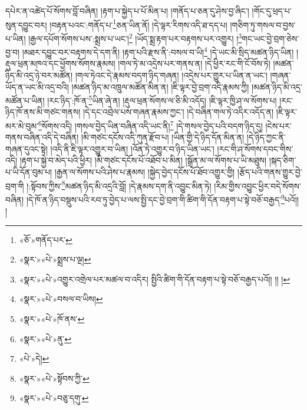 དཔེར་ན་འཚེད་པོ་སོགས་བློ་བཞིན། །རྟག་པ་སྐྱེད་པ་པོ་མིན་པ། །གནོད་པ་ཅན་དུ་ཤེས་བྱ་ཞིང་། །གོང་དུ་ཕྲད་པ་སུན་དབྱུང་བར། །བརྟན་པའང་:གནོད་པ་\footnote{«ཅོ་»གནོད་པར་}ཅན་ཡིན་ནོ། །དེ་ལྟར་རིགས་འདི་ཐ་དད་པ། །གཅིག་ཏུ་གསལ་བ་བྱས་པ་ཡིན། །རྒྱལ་དཔོག་སོགས་པས་:སྨྲས་པ་ཡང་།\footnote{«སྣར་»«པེ་»སྨྲས་པ་ལྔ།} །ཡོད་སྨྲ་རྟག་པར་བརྟགས་པར་འགྱུར། །\footnote{«སྣར་»«པེ་»འགྱུར་འགྲེལ་པར་མཚལ་བ་འདིར། སྤྱིའི་ཚིག་གི་དོན་བརྟག་པ་སྟེ་བཅོ་བརྒྱད་པའོ།། །། །}གང་ཡང་བྱེ་བྲག་ཅེས་བྱ་བ། །མཐར་དབྱུང་བར་བརྟགས་དེ་དག་ནི། །རྟག་པའི་རྫས་ནི་:བསལ་བ་ཡི།\footnote{«སྣར་»«པེ་»བསལ་བ་ཡིས།} །དེ་ཡང་མི་སྲིད་མཚན་ཉིད་ཡིན། །རྡུལ་ཕྲན་མཁའ་དང་ཕྱོགས་སོགས་རྣམས། །གལ་ཏེ་མ་འདྲེས་པར་གནས་ན། །དེ་ཕྱིར་རང་གི་ངོ་བོས་ཏེ། །མཚན་ཉིད་མི་འདྲ་ཉེ་བར་མཚོན། །གལ་ཏེའང་དེ་རྣམས་བདག་ཉིད་གཞན། །འདྲེས་པར་གྱུར་པ་ཡིན་ན་ཡང་། །གཞན་ཡོད་ན་ཡང་མི་འདྲ་བའི། །མཚན་ཉིད་མ་འཁྲུལ་མཚོན་མིན་ན། །ཇི་ལྟར་བྱེ་བྲག་འདི་རྣམས་ཀྱི། །མཚན་ཉིད་མི་འདྲ་མཚོན་པ་ཡིན། །རང་ཉིད་:ཁོ་ན་\footnote{«སྣར་»«པེ་»ཁོ་ནས་}ཡིན་ཞེ་ན། །རྡུལ་ཕྲན་སོགས་ལ་ཅི་མི་འདོད། །ཇི་ལྟར་ཁྱི་ཤ་ལ་སོགས་པ། །རང་ཉིད་ཁོ་ནས་མི་གཙང་གནས། །དེ་དང་འབྲེལ་པས་གཞན་རྣམས་ཀྱང་། །དེ་བཞིན་གལ་ཏེ་འདིར་འདོད་ན། །ཇི་ལྟར་མར་མེ་བུམ་\footnote{«སྣར་»«པེ་»ནུ་}སོགས་འདི། །གསལ་བྱེད་ཡིན་བཞིན་འདི་ཡང་ནི།\footnote{«པེ་»དེ།} །དེ་གསལ་བྱེད་པའི་བདག་ཉིད་དུ། །ངེས་པར་གནས་བཞིན་འདི་དེ་བཞིན། །མི་གཙང་དངོས་འདི་ཀུན་རྫོབ་པ། །ཡིན་གྱི་དེ་ཉིད་དོན་མིན་ན། །དེ་ཉིད་ཀྱང་ནི་གཞན་དུའང་སྟེ། །འདི་ནི་ཇི་ལྟར་འགྱུར་བ་ཡིན། །འོན་ཏེ་འགྱུར་བ་ཉིད་ཡིན་ཡང་། །རང་གི་ཤ་སོགས་དབང་གིས་འདི། །རྟག་པ་སྐྱེ་བ་མེད་པའི་ཕྱིར། །མི་གཙང་དངོས་པོ་འཐོབ་པ་མིན། །སྒྲོན་མ་ལ་སོགས་པ་ཡི་མཐུས། །སྐད་ཅིག་པ་ཡི་དོན་བུམ་པ། །རྒྱན་ལ་སོགས་པའི་ཤེས་པ་རྣམས། །སྐྱེད་བྱེད་དངོས་པོ་ཐོབ་འགྱུར་གྱི། །རྩོད་པའི་གནས་གྱུར་བྱེ་བྲག་གི །:སྟོབས་ཀྱིས་\footnote{«སྣར་»«པེ་»སྟོབས་ཀྱི་}མཚན་ཉིད་མི་འདྲའི་བློ། །དེ་རྣམས་དག་ནི་འབྱུང་མིན་ཏེ། །རིམ་གྱིས་འབྱུང་ཕྱིར་བདེ་སོགས་བཞིན། །དེ་ཁོ་ན་ཉིད་བསྡུས་པའི་རབ་ཏུ་བྱེད་པ་ལས་སྤྱི་དང་བྱེ་བྲག་གི་ཚིག་གི་དོན་བརྟག་པ་སྟེ་བཅོ་བརྒྱད་\footnote{«སྣར་»«པེ་»བཅུ་དགུ་}པའོ།། །
